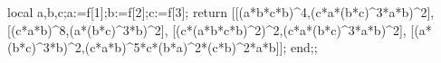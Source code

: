 \documentclass[
  10pt,
  letterpaper,
]{article}
\newenvironment{Shaded}{}{}
\newcommand{\ExtensionTok}[1]{#1}
\newcommand{\FloatTok}[1]{\textcolor[rgb]{0.25,0.63,0.44}{#1}}
\newcommand{\FunctionTok}[1]{\textcolor[rgb]{0.02,0.16,0.49}{#1}}
\newcommand{\NormalTok}[1]{#1}
\newcommand{\OperatorTok}[1]{\textcolor[rgb]{0.40,0.40,0.40}{#1}}
\newcommand{\VariableTok}[1]{\textcolor[rgb]{0.10,0.09,0.49}{#1}}
\begin{document}
\begin{Shaded}
\begin{Highlighting}[]
 \ExtensionTok{local} \VariableTok{a}\OperatorTok{,}\VariableTok{b}\OperatorTok{,}\VariableTok{c}\OperatorTok{;}\VariableTok{a}\OperatorTok{:=}\VariableTok{f}\NormalTok{[}\FloatTok{1}\NormalTok{]}\OperatorTok{;}\VariableTok{b}\OperatorTok{:=}\VariableTok{f}\NormalTok{[}\FloatTok{2}\NormalTok{]}\OperatorTok{;}\VariableTok{c}\OperatorTok{:=}\VariableTok{f}\NormalTok{[}\FloatTok{3}\NormalTok{]}\OperatorTok{;}
 \ExtensionTok{return}\NormalTok{ [[(}\VariableTok{a}\OperatorTok{*}\VariableTok{b}\OperatorTok{*}\VariableTok{c}\OperatorTok{*}\VariableTok{b}\NormalTok{)}\OperatorTok{\^{}}\FloatTok{4}\OperatorTok{,}\NormalTok{(}\VariableTok{c}\OperatorTok{*}\VariableTok{a}\OperatorTok{*}\NormalTok{(}\VariableTok{b}\OperatorTok{*}\VariableTok{c}\NormalTok{)}\OperatorTok{\^{}}\FloatTok{3}\OperatorTok{*}\VariableTok{a}\OperatorTok{*}\VariableTok{b}\NormalTok{)}\OperatorTok{\^{}}\FloatTok{2}\NormalTok{]}\OperatorTok{,}
\NormalTok{ [(}\VariableTok{c}\OperatorTok{*}\VariableTok{a}\OperatorTok{*}\VariableTok{b}\NormalTok{)}\OperatorTok{\^{}}\FloatTok{8}\OperatorTok{,}\NormalTok{(}\VariableTok{a}\OperatorTok{*}\NormalTok{(}\VariableTok{b}\OperatorTok{*}\VariableTok{c}\NormalTok{)}\OperatorTok{\^{}}\FloatTok{3}\OperatorTok{*}\VariableTok{b}\NormalTok{)}\OperatorTok{\^{}}\FloatTok{2}\NormalTok{]}\OperatorTok{,}
\NormalTok{ [(}\VariableTok{c}\OperatorTok{*}\NormalTok{(}\VariableTok{a}\OperatorTok{*}\VariableTok{b}\OperatorTok{*}\VariableTok{c}\OperatorTok{*}\VariableTok{b}\NormalTok{)}\OperatorTok{\^{}}\FloatTok{2}\NormalTok{)}\OperatorTok{\^{}}\FloatTok{2}\OperatorTok{,}\NormalTok{(}\VariableTok{c}\OperatorTok{*}\VariableTok{a}\OperatorTok{*}\NormalTok{(}\VariableTok{b}\OperatorTok{*}\VariableTok{c}\NormalTok{)}\OperatorTok{\^{}}\FloatTok{3}\OperatorTok{*}\VariableTok{a}\OperatorTok{*}\VariableTok{b}\NormalTok{)}\OperatorTok{\^{}}\FloatTok{2}\NormalTok{]}\OperatorTok{,}
\NormalTok{ [(}\VariableTok{a}\OperatorTok{*}\NormalTok{(}\VariableTok{b}\OperatorTok{*}\VariableTok{c}\NormalTok{)}\OperatorTok{\^{}}\FloatTok{3}\OperatorTok{*}\VariableTok{b}\NormalTok{)}\OperatorTok{\^{}}\FloatTok{2}\OperatorTok{,}\NormalTok{(}\VariableTok{c}\OperatorTok{*}\VariableTok{a}\OperatorTok{*}\VariableTok{b}\NormalTok{)}\OperatorTok{\^{}}\FloatTok{5}\OperatorTok{*}\VariableTok{c}\OperatorTok{*}\NormalTok{(}\VariableTok{b}\OperatorTok{*}\VariableTok{a}\NormalTok{)}\OperatorTok{\^{}}\FloatTok{2}\OperatorTok{*}\NormalTok{(}\VariableTok{c}\OperatorTok{*}\VariableTok{b}\NormalTok{)}\OperatorTok{\^{}}\FloatTok{2}\OperatorTok{*}\VariableTok{a}\OperatorTok{*}\VariableTok{b}\NormalTok{]]}\OperatorTok{;}
\FunctionTok{end}\OperatorTok{;;}

\end{Highlighting}
\end{Shaded}
\end{document}
